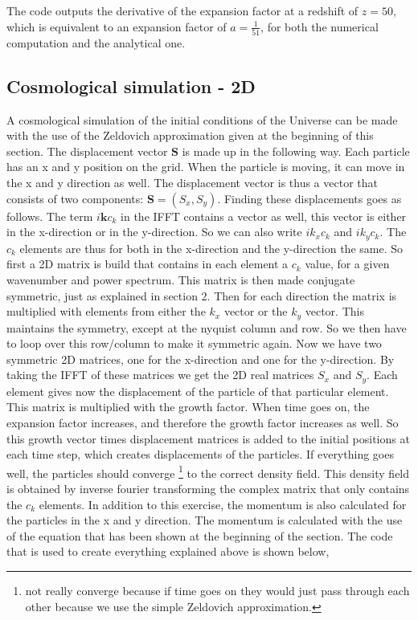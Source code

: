 

The code outputs the derivative of the expansion factor at a redshift of $z = 50$, which is equivalent to an expansion factor of $a = \frac{1}{51}$, for both the numerical computation and the analytical one.



\subsection{Cosmological simulation - 2D}

A cosmological simulation of the initial conditions of the Universe can be made with the use of the Zeldovich approximation given at the beginning of this section. The displacement vector $\textbf{S}$ is made up in the following way. Each particle has an x and y position on the grid. When the particle is moving, it can move in the x and y direction as well. The displacement vector is thus a vector that consists of two components: $\textbf{S} = (S_x, S_y)$. Finding these displacements goes as follows. The term $i\textbf{k}c_k$ in the IFFT contains a vector as well, this vector is either in the x-direction or in the y-direction. So we can also write $ik_x c_k$ and $ik_yc_k$. The $c_k$ elements are thus for both in the x-direction and the y-direction the same. So first a 2D matrix is build that contains in each element a $c_k$ value, for a given wavenumber and power spectrum. This matrix is then made conjugate symmetric, just as explained in section 2. Then for each direction the matrix is multiplied with elements from either the $k_x$ vector or the $k_y$ vector. This maintains the symmetry, except at the nyquist column and row. So we then have to loop over this row/column to make it symmetric again. Now we have two symmetric 2D matrices, one for the x-direction and one for the y-direction. By taking the IFFT of these matrices we get the 2D real matrices $S_x$ and $S_y$. Each element gives now the displacement of the particle of that particular element. This matrix is multiplied with the growth factor. When time goes on, the expansion factor increases, and therefore the growth factor increases as well. So this growth vector times displacement matrices is added to the initial positions at each time step, which creates displacements of the particles. If everything goes well, the particles should converge \footnote{not really converge because if time goes on they would just pass through each other because we use the simple Zeldovich approximation.} to the correct density field. This density field is obtained by inverse fourier transforming the complex matrix that only contains the $c_k$ elements. In addition to this exercise, the momentum is also calculated for the particles in the x and y direction. The momentum is calculated with the use of the equation that has been shown at the beginning of the section. The code that is used to create everything explained above is shown below,

